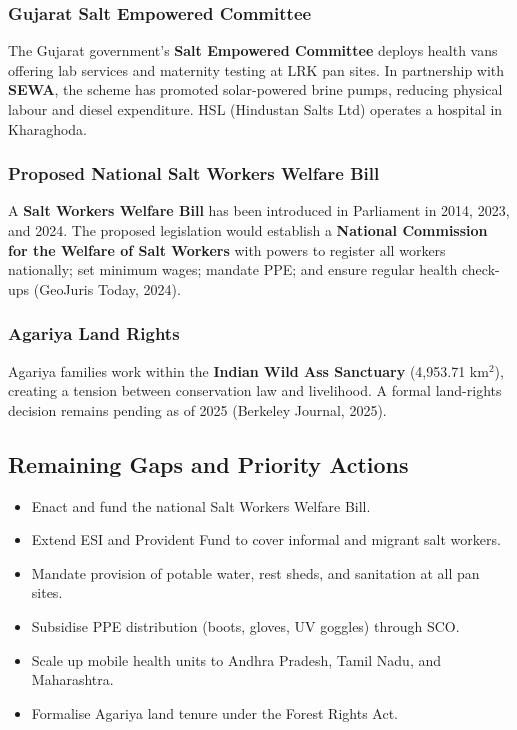 \documentclass[12pt,a4paper]{article}
\begin{document}
\subsubsection{Gujarat Salt Empowered Committee}

The Gujarat government's \textbf{Salt Empowered Committee} deploys health vans offering
lab services and maternity testing at LRK pan sites. In partnership with \textbf{SEWA},
the scheme has promoted solar-powered brine pumps, reducing physical labour and diesel
expenditure. HSL (Hindustan Salts Ltd) operates a hospital in Kharaghoda.

\subsubsection{Proposed National Salt Workers Welfare Bill}

A \textbf{Salt Workers Welfare Bill} has been introduced in Parliament in 2014, 2023,
and 2024. The proposed legislation would establish a \textbf{National Commission for the
Welfare of Salt Workers} with powers to register all workers nationally; set minimum
wages; mandate PPE; and ensure regular health check-ups (GeoJuris Today, 2024).

\subsubsection{Agariya Land Rights}

Agariya families work within the \textbf{Indian Wild Ass Sanctuary} (4,953.71 km$^2$),
creating a tension between conservation law and livelihood. A formal land-rights decision
remains pending as of 2025 (Berkeley Journal, 2025).

\subsection{Remaining Gaps and Priority Actions}

\begin{itemize}[leftmargin=*]
  \item Enact and fund the national Salt Workers Welfare Bill.
  \item Extend ESI and Provident Fund to cover informal and migrant salt workers.
  \item Mandate provision of potable water, rest sheds, and sanitation at all pan sites.
  \item Subsidise PPE distribution (boots, gloves, UV goggles) through SCO.
  \item Scale up mobile health units to Andhra Pradesh, Tamil Nadu, and Maharashtra.
  \item Formalise Agariya land tenure under the Forest Rights Act.
\end{itemize}
\end{document}
